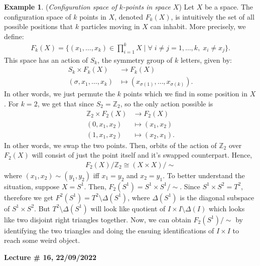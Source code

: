 \documentclass[letterpaper,11pt,twoside]{article}
\theoremstyle{definition}
\theoremstyle{definition}
\theoremstyle{definition}
\theoremstyle{definition}
\theoremstyle{definition}
\newtheorem*{example}{\textbf{Example}}
\theoremstyle{definition}
\theoremstyle{remark}
\theoremstyle{definition}
\newcommand{\isom}{\cong}
\newcommand{\newlecture}[2]{\begin{center}
    \textbf{Lecture \# #1, #2}
\end{center}}
\newcommand{\Z}[0]{\mathbb{Z}}
\begin{document}
\begin{example}
(\textit{Configuration space of $k$-points in space $X$}) Let $X$ be a space. The configuration space of $k$ points in $X$, denoted $F_k(X)$, is intuitively the set of all possible positions that $k$ particles moving in $X$ can inhabit. More precisely, we define:
\begin{align*}
    F_k(X) = \{(x_1,\dots,x_k) \in \prod_{i=1}^k X\;\vert\; \forall \;i\neq j = 1,\dots,k, \; x_i \neq x_j \}.
\end{align*}
This space has an action of $S_k$, the symmetry group of $k$ letters, given by:
\begin{align*}
    S_k\times F_k(X) &\longrightarrow F_k(X)\\
    (\sigma, x_1,\dots,x_k) &\longmapsto (x_{\sigma(1)},\dots,x_{\sigma(k)}).
\end{align*}
In other words, we just permute the $k$ points which we find in some position in $X$. For $k=2$, we get that since $S_2 = \Z_2$, so the only action possible is
\begin{align*}
    \Z_2 \times F_2(X) &\longrightarrow F_2(X)\\
    (0,x_1,x_2) &\longmapsto (x_1,x_2)\\
    (1,x_1,x_2)&\longmapsto (x_2,x_1).
\end{align*}
In other words, we swap the two points. Then, orbits of the action of $\Z_2$ over $F_2(X)$ will consist of just the point itself and it's swapped counterpart. Hence, 
\begin{align*}
    F_2(X)/\Z_2 \isom (X\times X) / \sim
\end{align*}
where $(x_1,x_2) \sim (y_1,y_2)$ iff $x_1=y_2$ and $x_2 = y_1$. To better understand the situation, suppose $X= S^1$. Then, $F_2(S^1) = S^1\times S^1/ \sim$. Since $S^1  \times S^2 = T^2$, therefore we get $F^2(S^1) = T^2  \setminus \Delta (S^1)$, where $\Delta(S^1)$ is the diagonal subspace of $S^1\times S^2$. But $T^2\setminus \Delta(S^1)$ will look like quotient of $I\times I \setminus \Delta(I) $ which looks like two disjoint right triangles together. Now, we can obtain $F_2(S^1)/\sim$ by identifying the two triangles and doing the ensuing identifications of $I\times I$ to reach some weird object. 
\end{example}
\newlecture{16}{22/09/2022}
\end{document}
